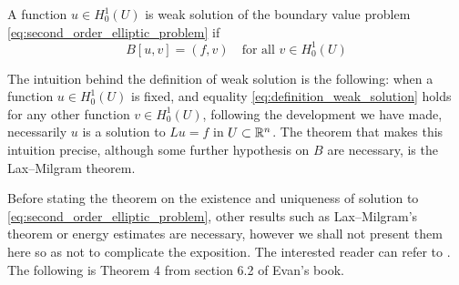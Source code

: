 \begin{definition*}
	A function $u \in H^1_0(U)$ is weak solution of the boundary value problem
	\eqref{eq:second_order_elliptic_problem} if
	\begin{equation} \label{eq:definition_weak_solution}
		B[u,v] = (f,v) \quad \text{for all } v \in H^1_0(U)
	\end{equation}
\end{definition*}

\noindent
The intuition behind the definition of weak solution is the following: when a
function $u \in H^1_0(U)$ is fixed, and equality
\eqref{eq:definition_weak_solution} holds for any other function $v \in
H^1_0(U)$, following the development we have made, necessarily $u$ is a solution
to $L u = f$ in $U \subset \mathbb{R}^n$. The theorem that makes this intuition
precise, although some further hypothesis on $B$ are necessary, is the
Lax--Milgram theorem. 

Before stating the theorem on the existence and uniqueness of solution to
\eqref{eq:second_order_elliptic_problem}, other results such as Lax--Milgram's
theorem or energy estimates are necessary, however we shall not present them
here so as not to complicate the exposition. The interested reader can refer to
\cite{evans1998pde}. The following is Theorem 4 from section 6.2 of Evan's book.

